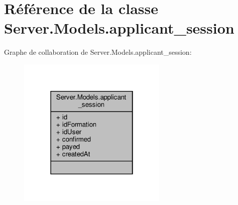 \hypertarget{class_server_1_1_models_1_1applicant__session}{}\section{Référence de la classe Server.\+Models.\+applicant\+\_\+session}
\label{class_server_1_1_models_1_1applicant__session}


Graphe de collaboration de Server.\+Models.\+applicant\+\_\+session\+:\nopagebreak
\begin{figure}[H]
\begin{center}
\leavevmode
\includegraphics[width=202pt]{class_server_1_1_models_1_1applicant__session__coll__graph}
\end{center}
\end{figure}
